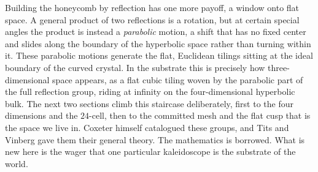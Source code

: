 Building the honeycomb by reflection has one more payoff, a window onto flat space. A general product of two reflections is a rotation, but at certain special angles the product is instead a \emph{parabolic} motion, a shift that has no fixed center and slides along the boundary of the hyperbolic space rather than turning within it. These parabolic motions generate the flat, Euclidean tilings sitting at the ideal boundary of the curved crystal. In the substrate this is precisely how three-dimensional space appears, as a flat cubic tiling woven by the parabolic part of the full reflection group, riding at infinity on the four-dimensional hyperbolic bulk. The next two sections climb this staircase deliberately, first to the four dimensions and the $24$-cell, then to the committed mesh and the flat cusp that is the space we live in. Coxeter himself catalogued these groups, and Tits and Vinberg gave them their general theory. The mathematics is borrowed. What is new here is the wager that one particular kaleidoscope is the substrate of the world.
